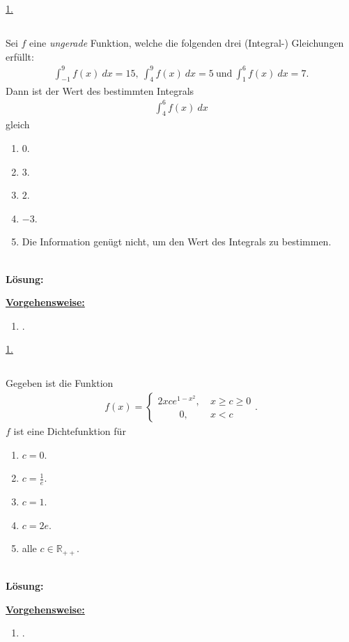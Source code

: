 \underline{1. }\\

\newpage

\subsection*{}
Sei $ f $ eine \textit{ungerade} Funktion, welche die folgenden drei (Integral-) Gleichungen erfüllt:
\begin{align*}
	\int_{-1}^9 f(x) \ dx = 15, \
	\int_4^9 f(x) \ dx = 5 \ \textrm{und} \
	\int_1^6 f(x) \ dx = 7.
\end{align*}
Dann ist der Wert des bestimmten Integrals
\begin{align*}
	\int_4^6 f(x) \ dx
\end{align*}  
gleich
\renewcommand{\labelenumi}{(\alph{enumi})}
\begin{enumerate}
	\item 
	$ 0 $.
	\item
	$ 3 $.
	\item
	$ 2 $.
	\item
	$ -3 $.
	\item
	Die Information genügt nicht, um den Wert des Integrals zu bestimmen.
\end{enumerate}\ \\
\textbf{Lösung:}
\begin{mdframed}
\underline{\textbf{Vorgehensweise:}}
\renewcommand{\labelenumi}{\theenumi.}
\begin{enumerate}
\item .
\end{enumerate}
\end{mdframed}

\underline{1. }\\
 

\newpage
\subsection*{}
Gegeben ist die Funktion
\begin{align*}
	f(x) =
	\begin{cases}
		2 x c e^{1 - x^2}, \ &x \geq c  \geq 0\\
		\qquad	\ 0 , \ &x < c
	\end{cases}.
\end{align*}
$ f $ ist eine Dichtefunktion für
\renewcommand{\labelenumi}{(\alph{enumi})}
\begin{enumerate}
	\item 
	$ c = 0 $.
	\item 
	$ c = \frac{1}{e} $.
	\item 
	$ c= 1 $.
	\item 
	$ c = 2e $.
	\item
	alle $ c \in \mathbb{R}_{++} $.
\end{enumerate}
\ \\
\textbf{Lösung:}
\begin{mdframed}
\underline{\textbf{Vorgehensweise:}}
\renewcommand{\labelenumi}{\theenumi.}
\begin{enumerate}
\item .
\end{enumerate}
\end{mdframed}


